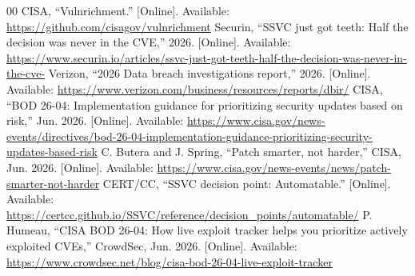 \documentclass[conference]{IEEEtran}
\begin{document}
\begin{thebibliography}{00}
 CISA, ``Vulnrichment.'' [Online]. Available: \url{https://github.com/cisagov/vulnrichment}
 Securin, ``SSVC just got teeth: Half the decision was never in the CVE,'' 2026. [Online]. Available: \url{https://www.securin.io/articles/ssvc-just-got-teeth-half-the-decision-was-never-in-the-cve-}
 Verizon, ``2026 Data breach investigations report,'' 2026. [Online]. Available: \url{https://www.verizon.com/business/resources/reports/dbir/}
 CISA, ``BOD 26-04: Implementation guidance for prioritizing security updates based on risk,'' Jun. 2026. [Online]. Available: \url{https://www.cisa.gov/news-events/directives/bod-26-04-implementation-guidance-prioritizing-security-updates-based-risk}
 C. Butera and J. Spring, ``Patch smarter, not harder,'' CISA, Jun. 2026. [Online]. Available: \url{https://www.cisa.gov/news-events/news/patch-smarter-not-harder}
 CERT/CC, ``SSVC decision point: Automatable.'' [Online]. Available: \url{https://certcc.github.io/SSVC/reference/decision_points/automatable/}
 P. Humeau, ``CISA BOD 26-04: How live exploit tracker helps you prioritize actively exploited CVEs,'' CrowdSec, Jun. 2026. [Online]. Available: \url{https://www.crowdsec.net/blog/cisa-bod-26-04-live-exploit-tracker}
\end{thebibliography}
\end{document}
